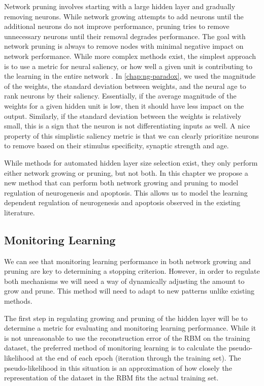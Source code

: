 Network pruning involves starting with a large hidden layer and gradually removing neurons.
While network growing attempts to add neurons until the additional neurons do not 
improve performance, pruning tries to remove unnecessary 
neurons until their removal degrades performance. 
The goal with network pruning is always 
to remove nodes with minimal negative impact on network performance. 
While more complex methods exist, 
the simplest approach is to use a metric for neural saliency, or how well
a given unit is contributing to the learning in the entire network \citep{optimal-brain-damage}. 
In \cref{chap:ng-paradox}, we used the 
magnitude of the weights, the standard deviation between weights, and 
the neural age to rank neurons by their saliency. 
Essentially, if the average 
magnitude of the weights for a given hidden unit is low, then it 
should have less impact on the output. 
Similarly, if the standard deviation between the weights is 
relatively small, this is a sign that the neuron is not differentiating inputs as well.
A nice property of this simplistic saliency metric is that we can clearly 
prioritize neurons to remove based on their stimulus specificity, 
synaptic strength and age.

While methods for automated hidden layer size selection exist, they only perform either
network growing or pruning, but not both.
In this chapter we propose a new 
method that can perform both network growing and pruning 
to model regulation of neurogenesis and apoptosis. 
This allows us to model the learning dependent regulation 
of neurogenesis and apoptosis observed in the existing literature.

\subsection{Monitoring Learning}

We can see that monitoring learning performance in both network 
growing and pruning are key to determining a 
stopping criterion.
However, in order to regulate both mechanisms 
we will need a way of dynamically adjusting 
the amount to grow and prune. 
This method will need to 
adapt to new patterns unlike existing methods.

The first step in regulating growing and pruning of the hidden layer 
will be to determine a metric for evaluating and monitoring learning 
performance. 
While it is not unreasonable to use the reconstruction 
error of the \ac{RBM} on the training dataset, the preferred method 
of monitoring learning is to calculate the pseudo-likelihood at the 
end of each epoch (iteration through the training set). 
The pseudo-likelihood in this situation is an approximation 
of how closely the representation of the dataset in the \ac{RBM} fits 
the actual training set.

